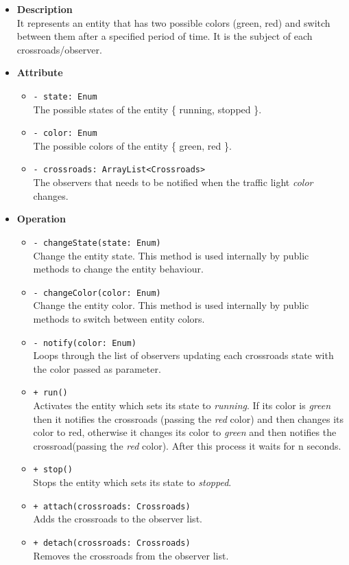 \begin{itemize}
  \item \textbf{Description} \\
    It represents an entity that has two possible colors (green, red) and switch
between them after a specified period of time. It is the subject of each 
crossroads/observer.
  \item \textbf{Attribute}
  \begin{itemize}
    \item \texttt{- state: Enum} \\
The possible states of the entity \{ running, stopped \}.
    \item \texttt{- color: Enum} \\
The possible colors of the entity \{ green, red \}.
    \item \texttt{- crossroads: ArrayList<Crossroads>} \\
The observers that needs to be notified when the traffic light \textit{color} 
changes.
  \end{itemize}
  \item \textbf{Operation}
  \begin{itemize} 
    \item \texttt{- changeState(state: Enum)} \\
Change the entity state. This method is used internally by public methods to 
change the entity behaviour.
    \item \texttt{- changeColor(color: Enum)} \\
Change the entity color. This method is used internally by public methods to 
switch between entity colors.
    \item \texttt{- notify(color: Enum)} \\
Loops through the list of observers updating each crossroads state with the 
color passed as parameter. 
    \item \texttt{+ run()} \\
Activates the entity which sets its state to \textit{running}. If its color is 
\textit{green} then it notifies the crossroads (passing the \textit{red} color)
and then changes its color to red, otherwise it changes its color to 
\textit{green} and then notifies the crossroad(passing the \textit{red} color).
After this process it waits for n seconds.    
    \item \texttt{+ stop()} \\
Stops the entity which sets its state to \textit{stopped}.
    \item \texttt{+ attach(crossroads: Crossroads)} \\
Adds the crossroads to the observer list.
    \item \texttt{+ detach(crossroads: Crossroads)} \\
Removes the crossroads from the observer list.
  \end{itemize}
\end{itemize}
